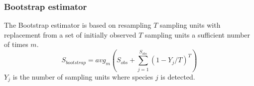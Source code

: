 \documentclass[sigconf,review,anonymous]{acmart}
\newcommand{\Bootstrap}{Bootstrap\xspace}
\newcounter{todocounter}
\newcommand{\todo}[1]{\marginpar{$|$}\textcolor{red}{\stepcounter{todocounter}\footnote[\thetodocounter]{\textcolor{red}{\textbf{TODO }}\textit{#1}}}}
\def\<#1>{\texttt{#1}}
\renewcommand{\todo}[1]{}
\begin{document}
\subsubsection{Bootstrap estimator~\cite{smith1984nonparametric}} %
The \Bootstrap estimator
is based on resampling $T$ sampling units with replacement from a set of
initially observed $T$ sampling units a sufficient number of times $m$.
\begin{displaymath}
S_{bootstrap}  = {avg}_{m}( S_{obs} + \sum^{S_{obs}}_{j=1} (1 - Y_j/T)^T)
\end{displaymath}
$Y_{j}$ is the number of sampling units %
where species $j$ is detected. %

\end{document}

